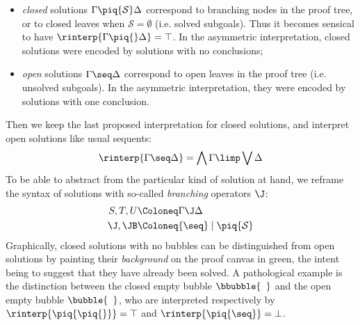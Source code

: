 \begin{itemize}
  \item \emph{closed} solutions $\Gamma \piq{\mathcal{S}} \Delta$ correspond
  to branching nodes in the proof tree, or to closed leaves when $\mathcal{S} =
  \emptyset$ (i.e. solved subgoals). Thus it becomes sensical to have
  $\rinterp{\Gamma \piq{} \Delta} = \top$. In the asymmetric interpretation,
  closed solutions were encoded by solutions with no conclusions;
  \item \emph{open} solutions $\Gamma \seq \Delta$ correspond to open leaves
  in the proof tree (i.e. unsolved subgoals). In the asymmetric interpretation,
  they were encoded by solutions with one conclusion.
\end{itemize}
Then we keep the last proposed interpretation for closed solutions, and
interpret open solutions like usual sequents:
$$\rinterp{\Gamma \seq \Delta} = \bigwedge{\Gamma} \limp \bigvee{\Delta}$$ To be
able to abstract from the particular kind of solution at hand, we reframe the
syntax of solutions with so-called \emph{branching} operators $\J$:
\begin{align*}
  S, T, U &\Coloneq \Gamma \J \Delta \\
  \J, \JB &\Coloneq {\seq} \mid \piq{\mathcal{S}}
\end{align*}
Graphically, closed solutions with no bubbles can be distinguished from
open solutions by painting their \emph{background} on the proof canvas in
green, the intent being to suggest that they have already been solved. A
pathological example is the distinction between the closed empty bubble
$\bbubble{\phantom{a}}$ and the open empty bubble $\bubble{\phantom{a}}$,
who are interpreted respectively by $\rinterp{\piq{\piq{}}} = \top$ and
$\rinterp{\piq{\seq}} = \bot$.

